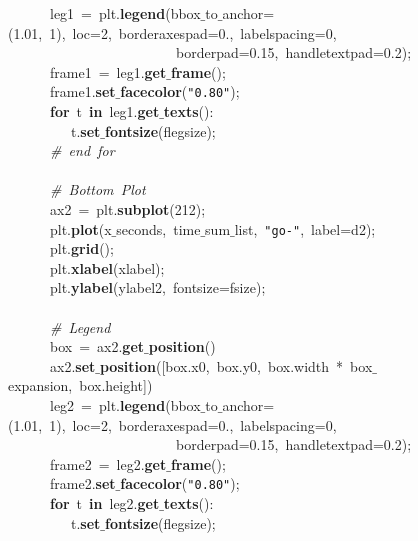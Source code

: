 \mbox{}\ \ \ \ \ \ leg1\ =\ plt.\textbf{legend}(bbox$\_$to$\_$anchor=(1.01,\ 1),\ loc=2,\ borderaxespad=0.,\ labelspacing=0,\  \\
\mbox{}\ \ \ \ \ \ \ \ \ \ \ \ \ \ \ \ \ \ \ \ \ \ \ \ borderpad=0.15,\ handletextpad=0.2); \\
\mbox{}\ \ \ \ \ \ frame1\ =\ leg1.\textbf{get$\_$frame}(); \\
\mbox{}\ \ \ \ \ \ frame1.\textbf{set$\_$facecolor}(\texttt{"{}0.80"{}}); \\
\mbox{}\ \ \ \ \ \ \textbf{for}\ t\ \textbf{in}\ leg1.\textbf{get$\_$texts}(): \\
\mbox{}\ \ \ \ \ \ \ \ \ t.\textbf{set$\_$fontsize}(flegsize); \\
\mbox{}\ \ \ \ \ \ \textit{\#\ end\ for} \\
\mbox{}\ \ \ \ \ \  \\
\mbox{}\ \ \ \ \ \ \textit{\#\ Bottom\ Plot} \\
\mbox{}\ \ \ \ \ \ ax2\ =\ plt.\textbf{subplot}(212); \\
\mbox{}\ \ \ \ \ \ plt.\textbf{plot}(x$\_$seconds,\ time$\_$sum$\_$list,\ \texttt{"{}go-"{}},\ label=d2); \\
\mbox{}\ \ \ \ \ \ plt.\textbf{grid}(); \\
\mbox{}\ \ \ \ \ \ plt.\textbf{xlabel}(xlabel); \\
\mbox{}\ \ \ \ \ \ plt.\textbf{ylabel}(ylabel2,\ fontsize=fsize); \\
\mbox{}\ \ \ \ \ \  \\
\mbox{}\ \ \ \ \ \ \textit{\#\ Legend} \\
\mbox{}\ \ \ \ \ \ box\ =\ ax2.\textbf{get$\_$position}() \\
\mbox{}\ \ \ \ \ \ ax2.\textbf{set$\_$position}([box.x0,\ box.y0,\ box.width\ *\ box$\_$expansion,\ box.height]) \\
\mbox{}\ \ \ \ \ \ leg2\ =\ plt.\textbf{legend}(bbox$\_$to$\_$anchor=(1.01,\ 1),\ loc=2,\ borderaxespad=0.,\ labelspacing=0,\  \\
\mbox{}\ \ \ \ \ \ \ \ \ \ \ \ \ \ \ \ \ \ \ \ \ \ \ \ borderpad=0.15,\ handletextpad=0.2); \\
\mbox{}\ \ \ \ \ \ frame2\ =\ leg2.\textbf{get$\_$frame}(); \\
\mbox{}\ \ \ \ \ \ frame2.\textbf{set$\_$facecolor}(\texttt{"{}0.80"{}}); \\
\mbox{}\ \ \ \ \ \ \textbf{for}\ t\ \textbf{in}\ leg2.\textbf{get$\_$texts}(): \\
\mbox{}\ \ \ \ \ \ \ \ \ t.\textbf{set$\_$fontsize}(flegsize); \\
